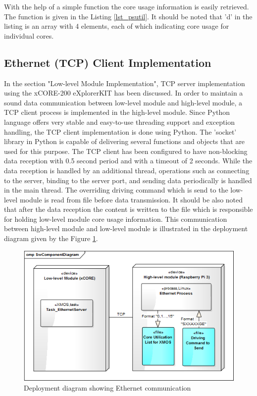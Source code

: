 With the help of a simple function the core usage information is easily retrieved. The function is given in the Listing \ref{lst_psutil}. It should be noted that 'd' in the listing is an array with 4 elements, each of which indicating core usage for individual cores.



\subsection{Ethernet (TCP) Client Implementation}
In the section "Low-level Module Implementation", TCP server implementation using the xCORE-200 eXplorerKIT has been discussed. In order to maintain a sound data communication between low-level module and high-level module, a TCP client process is implemented in the high-level module. Since Python language offers very stable and easy-to-use threading support and exception handling, the TCP client implementation is done using Python. The 'socket' library \cite{socketpython} in Python is capable of delivering several functions and objects that are used for this purpose. The TCP client has been configured to have non-blocking data reception with 0.5 second period and with a timeout of 2 seconds. While the data reception is handled by an additional thread, operations such as connecting to the server, binding to the server port, and sending data periodically is handled in the main thread. The overriding driving command which is send to the low-level module is read from file before data transmission. It should be also noted that after the data reception the content is written to the file which is responsible for holding low-level module core usage information. This communication between high-level module and low-level module is illustrated in the deployment diagram given by the Figure \ref{fig:ethernetdeployment}.

\begin{figure}[!ht]
	\includegraphics[scale=0.7]{content/images/ethernetdeployment.png}
	\caption{Deployment diagram showing Ethernet communication}
	\label{fig:ethernetdeployment}
\end{figure}

